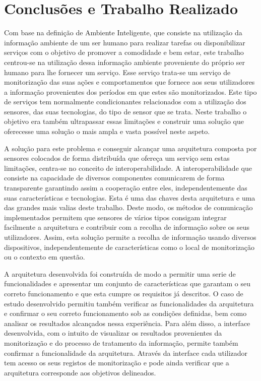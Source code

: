 \chapter{Conclusões e Trabalho Realizado}

Com base na definição de Ambiente Inteligente, que consiste na utilização da informação ambiente de um ser humano para realizar tarefas ou disponibilizar serviços com o objetivo de promover a comodidade e bem estar, este trabalho centrou-se na utilização dessa informação ambiente proveniente do próprio ser humano para lhe fornecer um serviço. Esse serviço trata-se um serviço de monitorização das suas ações e comportamentos que fornece aos seus utilizadores a informação provenientes dos períodos em que estes são monitorizados. Este tipo de serviços tem normalmente condicionantes relacionados com a utilização dos sensores, das suas tecnologias, do tipo de sensor que se trata. Neste trabalho o objetivo era também ultrapassar essas limitações e construir uma solução que oferecesse uma solução o mais ampla e vasta possível neste aspeto.

A solução para este problema e conseguir alcançar uma arquitetura composta por sensores colocados de forma distribuída que ofereça um serviço sem estas limitações, centra-se no conceito de interoperabilidade. A interoperabilidade que consiste na capacidade de diversos componentes comunicarem de forma transparente garantindo assim a cooperação entre eles, independentemente das suas características e tecnologias. Esta é uma das chaves desta arquitetura e uma das grandes mais valias deste trabalho. Deste modo, os métodos de comunicação implementados permitem que sensores de vários tipos consigam integrar facilmente a arquitetura e contribuir com a recolha de informação sobre os seus utilizadores. Assim, esta solução permite a recolha de informação usando diversos dispositivos, independentemente de características como o local de monitorização ou o contexto em questão.

A arquitetura desenvolvida foi construída de modo a permitir uma serie de funcionalidades e apresentar um conjunto de características que garantam o seu correto funcionamento e que esta cumpre os requisitos já descritos. O caso de estudo desenvolvido permitiu também verificar as funcionalidades da arquitetura e confirmar o seu correto funcionamento sob as condições definidas, bem como analisar os resultados alcançados nessa experiência. Para além disso, a interface desenvolvida, com o intuito de visualizar os resultados provenientes da monitorização e do processo de tratamento da informação, permite também confirmar a funcionalidade da arquitetura. Através da interface cada utilizador tem acesso os seus registos de monitorização e pode ainda verificar que a arquitetura corresponde aos objetivos delineados.



